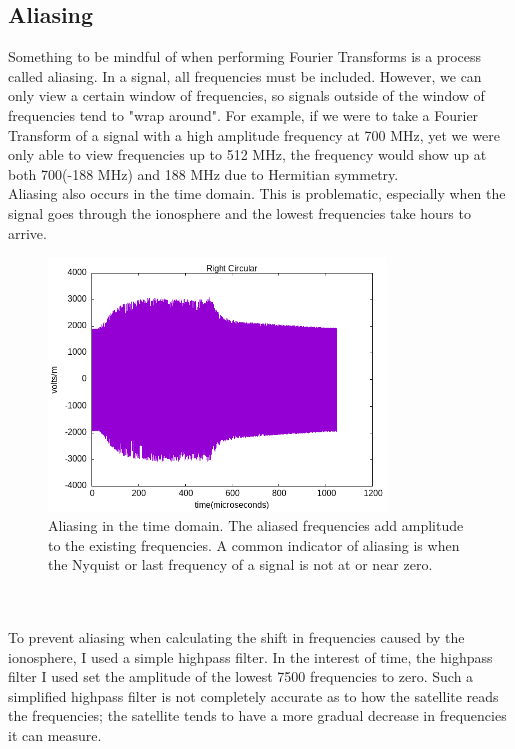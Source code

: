 \documentclass[12pt, reqno]{amsart}
\begin{document}
\subsection{Aliasing}
\noindent Something to be mindful of when performing Fourier Transforms is a process called aliasing. In a signal, all frequencies must be included. However, we can only view a certain window of frequencies, so signals outside of the window of frequencies tend to "wrap around". For example, if we were to take a Fourier Transform of a signal with a high amplitude frequency at 700  MHz, yet we were only able to view frequencies up to 512 MHz, the frequency would show up at both 700(-188 MHz) and 188 MHz due to Hermitian symmetry. 
\\ 
Aliasing also occurs in the time domain. This is problematic, especially when the signal goes through the ionosphere and the lowest frequencies take hours to arrive.

    \begin{figure}[h]
    \centering
    \includegraphics[width=0.8\textwidth]{time-aliasing.png}
    \caption{Aliasing in the time domain. The aliased frequencies add amplitude to the existing frequencies. A common indicator of aliasing is when the Nyquist or last frequency of a signal is not at or near zero. }
    \label{fig:time-aliasing}
    \end{figure}
    
\\
\\
\noindent To prevent aliasing when calculating the shift in frequencies caused by the ionosphere, I used a simple highpass filter. In the interest of time, the highpass filter I used set the amplitude of the lowest 7500 frequencies to zero. Such a simplified highpass filter is not completely accurate as to how the satellite reads the frequencies; the satellite tends to have a more gradual decrease in frequencies it can measure.
\end{document}
